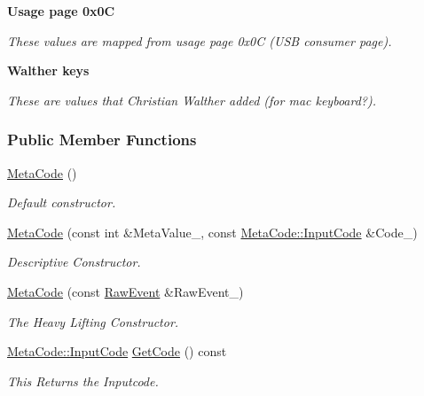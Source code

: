 \begin{Indent}{\bf Usage page 0x0C}\par
{\em These values are mapped from usage page 0x0C (USB consumer page). }\end{Indent}
\begin{Indent}{\bf Walther keys}\par
{\em These are values that Christian Walther added (for mac keyboard?). }\end{Indent}
\subsubsection*{Public Member Functions}
\begin{DoxyCompactItemize}
\item 
\hyperlink{classphys_1_1MetaCode_ae2c80c84f924ddfd880f46ffe6a1746e}{MetaCode} ()
\begin{DoxyCompactList}\small\item\em Default constructor. \item\end{DoxyCompactList}\item 
\hyperlink{classphys_1_1MetaCode_a590e6b767952e278b72ff71eddf369d4}{MetaCode} (const int \&MetaValue\_\-, const \hyperlink{classphys_1_1MetaCode_a3e501cbb5bf0f6f1fdb7211465bda8d8}{MetaCode::InputCode} \&Code\_\-)
\begin{DoxyCompactList}\small\item\em Descriptive Constructor. \item\end{DoxyCompactList}\item 
\hyperlink{classphys_1_1MetaCode_ad9a618b5cc6f9d0cf0a4bc4f47bf98e8}{MetaCode} (const \hyperlink{namespacephys_a8126d26e4507e66d09876988bb941fd4}{RawEvent} \&RawEvent\_\-)
\begin{DoxyCompactList}\small\item\em The Heavy Lifting Constructor. \item\end{DoxyCompactList}\item 
\hyperlink{classphys_1_1MetaCode_a3e501cbb5bf0f6f1fdb7211465bda8d8}{MetaCode::InputCode} \hyperlink{classphys_1_1MetaCode_a5835a05391cbb5a3dc83534a7bcf87d3}{GetCode} () const 
\begin{DoxyCompactList}\small\item\em This Returns the Inputcode. \item\end{DoxyCompactList}\item 

\end{DoxyCompactItemize}
